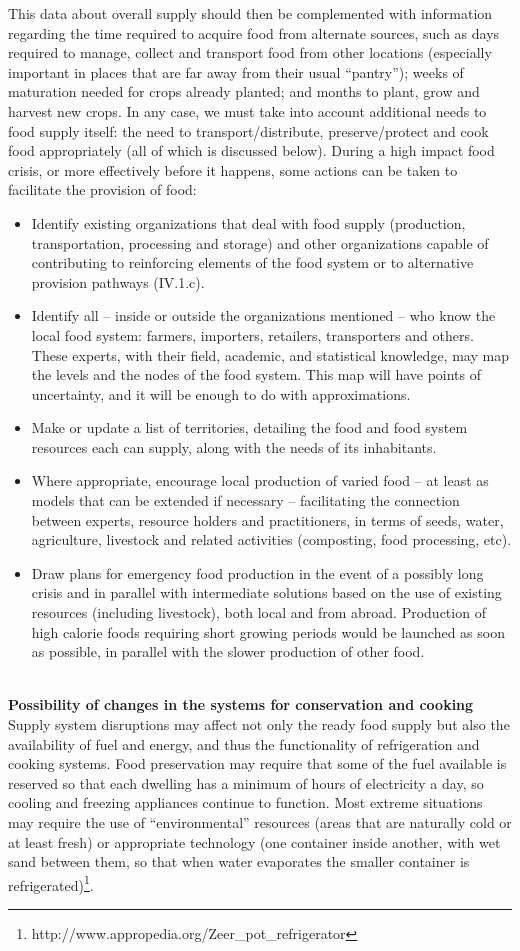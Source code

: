 \documentclass[12pt, a4]{scrartcl}
\begin{document}
This data about overall supply should then be complemented with information regarding the time required to acquire food from alternate sources, such as days required to manage, collect and transport food from other locations (especially important in places that are far away from their usual “pantry”); weeks of maturation needed for crops already planted; and months to plant, grow and harvest new crops. In any case, we must take into account additional needs to food supply itself: the need to transport/distribute, preserve/protect and cook food appropriately (all of which is discussed below). During a high impact food crisis, or more effectively before it happens, some actions can be taken to
facilitate the provision of food:
\begin{itemize}
	\item Identify existing organizations that deal with food supply (production, transportation, processing and storage) and other organizations capable of contributing to reinforcing elements of the food system or to alternative provision pathways (IV.1.c).
	\item Identify all – inside or outside the organizations mentioned – who know the local food system: farmers, importers, retailers, transporters and others. These experts, with their field, academic, and statistical knowledge, may map the levels and the nodes of the food system. This map will have points of uncertainty, and it will be enough to do with approximations.
	\item Make or update a list of territories, detailing the food and food system resources each can supply, along with the needs of its inhabitants.
	\item Where appropriate, encourage local production of varied food – at least as models that can be extended if necessary – facilitating the connection between experts, resource holders and practitioners, in terms of seeds, water, agriculture, livestock and related activities (composting, food processing, etc).
	\item Draw plans for emergency food production in the event of a possibly long crisis and in parallel with intermediate solutions based on the use of existing resources (including livestock), both local and from abroad. Production of high calorie foods requiring short growing periods would be launched as soon as possible, in parallel with the slower production of other food.
\end{itemize}
\\
\textbf{Possibility of changes in the systems for conservation and cooking}
Supply system disruptions may affect not only the ready food supply but also the availability of fuel and energy, and thus the functionality of refrigeration and cooking systems. Food preservation may require that some of the fuel available is reserved so that each dwelling has a minimum of hours of electricity a day, so cooling and freezing appliances continue to function. Most extreme situations may require the use of “environmental” resources (areas that are naturally cold or at least fresh) or appropriate technology (one container inside another, with wet sand between them, so that when water evaporates the smaller container is refrigerated)\footnote{http://www.appropedia.org/Zeer_pot_refrigerator}.
\end{document}
